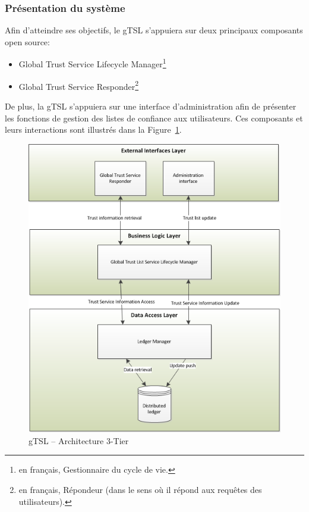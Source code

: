 \documentclass{tnreport}
\begin{document}
\subsubsection{Présentation du système}

Afin d'atteindre ses objectifs, le gTSL s'appuiera sur deux principaux composants open source:
\begin{itemize}
	\item Global Trust Service Lifecycle Manager\footnote{en français, Gestionnaire du cycle de vie.}
	\item Global Trust Service Responder\footnote{en français, Répondeur (dans le sens où il répond aux requêtes des utilisateurs).}
\end{itemize}
De plus, la gTSL s'appuiera sur une interface d'administration afin de présenter les fonctions de gestion des listes de confiance aux utilisateurs.
Ces composants et leurs interactions sont illustrés dans la Figure~\ref{fig:3tier-archi}.

\begin{figure}[h]
	\centering
	\includegraphics{figures/gTSL-3Tier}
	\caption{gTSL – Architecture 3-Tier \cite{design-document}}
	\label{fig:3tier-archi}
\end{figure}
\end{document}
